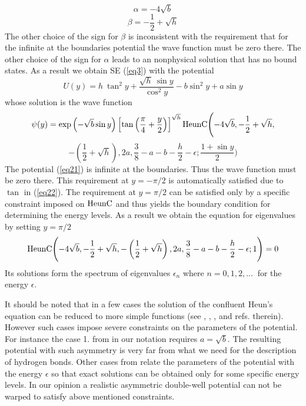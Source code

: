 \documentclass[singlespacing]{elsart}
\begin{document}
\begin{equation}
\label{eq19} \alpha=-4\sqrt {b}
\end{equation}
\begin{equation}
\label{eq20} \beta=-\frac{1}{2}+\sqrt {h}
\end{equation}
The other choice of the sign for $\beta$ is inconsistent with the requirement that for the infinite at the boundaries potential the wave function must be zero there. The other choice of the sign for $\alpha$ leads to an nonphysical solution that has no bound states.
As a result we obtain SE (\ref{eq3}) with the potential
\begin{equation}
\label{eq21} U(y)=h\ \tan^2 y+\frac{\sqrt {h}\ \sin y}{\cos^2 y}-b\sin^2 y+a\sin y
\end{equation}
whose solution is the wave function
\[
\psi(y)=\exp \left(-\sqrt {b}\sin y \right)\left[ \tan\left(\frac{\pi}{4}+\frac{y}{2}\right)\right]^{\sqrt {h}}{\rm HeunC} \Biggl(-4\sqrt {b},-\frac{1}{2}+\sqrt {h},
\]
\begin{equation}
\label{eq22} -\left(\frac{1}{2}+\sqrt {h}\right), 2a,
\frac{3}{8}-a-b-\frac{h}{2}-\epsilon;\frac{1+\sin y}{2}\Biggr)
\end{equation}
The potential (\ref{eq21}) is infinite at the boundaries. Thus the wave function must be zero there. This requirement at $y=-\pi/2$ is automatically satisfied due to $\tan$ in (\ref{eq22}). The requirement at $y=\pi/2$ can be satisfied only by a specific constraint imposed on ${\rm HeunC}$ and thus yields the boundary condition for determining the energy levels. As a result we obtain the equation for eigenvalues by setting $y=\pi/2$
\begin{equation}
\label{eq23}{\rm HeunC}\Biggl(-4\sqrt {b},-\frac{1}{2}+\sqrt {h},-\left(\frac{1}{2}+\sqrt {h}\right),2a,
\frac{3}{8}-a-b-\frac{h}{2}-\epsilon;1\Biggr)=0
\end{equation}
Its solutions form the spectrum of eigenvalues $\epsilon_n$ where $n=0,1,2, ...\ $ for the energy $\epsilon$.

It should be noted that in a few cases the solution of the confluent Heun's equation can be reduced to more simple functions (see \cite{Mai04}, \cite{Ish14}, \cite{Hou15}, \cite{Sha12} and refs. therein). However such cases impose severe constraints on the parameters of the potential. For instance the case 1. from \cite{Sha12} in our notation requires $a=\sqrt{b}$. The resulting potential with such asymmetry is very far from what we need for the description of hydrogen bonds. Other cases from \cite{Sha12} relate the parameters of the potential with the energy $\epsilon$ so that exact solutions can be obtained only for some specific energy levels. In our opinion a realistic asymmetric double-well potential can not be warped to satisfy above mentioned constraints.
\end{document}

